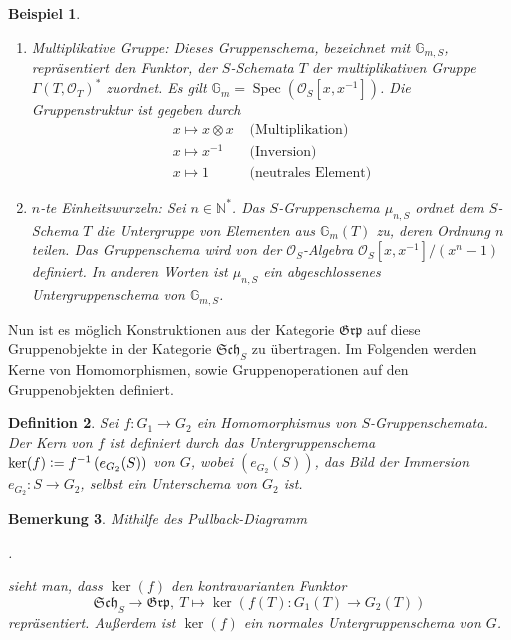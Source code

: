 \documentclass[DIV11,11pt]{scrartcl}
\theoremstyle{Definitionen}
\newtheorem{Def}{Definition}[section]
\newtheorem{Bem}[Def]{Bemerkung}
\newtheorem{Bsp}[Def]{Beispiel}
\theoremstyle{Aussagen}
\newcommand{\coloneq}{\ensuremath{\mathrel{\mathop{\raisebox{0.5pt}{:}}}=}}
\DeclareMathOperator{\Spec}{Spec}
\begin{document}
\begin{Bsp}\label{BspGruppenschema}
\begin{enumerate}
\item \textit{Multiplikative Gruppe}: Dieses Gruppenschema, bezeichnet mit $\mathbb{G}_{m,S}$, repräsentiert den Funktor, der $S$-Schemata $T$ der multiplikativen Gruppe $\Gamma(T,\mathcal{O}_T)^*$ zuordnet. Es gilt $\mathbb{G}_m=\Spec(\mathcal{O}_S\left[x,x^{-1}\right])$. Die Gruppenstruktur ist gegeben durch
\begin{align*}
x\mapsto x\otimes x &\text{ (Multiplikation)}\\
x\mapsto x^{-1} &\text{ (Inversion)}\\
x\mapsto 1 &\text{ (neutrales Element)}
\end{align*}
\item \textit{$n$-te Einheitswurzeln}: Sei $n\in\mathbb{N}^*$. Das $S$-Gruppenschema $\mu_{n,S}$ ordnet dem $S$-Schema $T$ die Untergruppe von Elementen aus $\mathbb{G}_m(T)$ zu, deren Ordnung $n$ teilen. Das Gruppenschema wird von der $\mathcal{O}_S$-Algebra $\mathcal{O}_S\left[x,x^{-1}\right]/(x^n-1)$ definiert. In anderen Worten ist $\mu_{n,S}$ ein abgeschlossenes Untergruppenschema von $\mathbb{G}_{m,S}$.
\end{enumerate}
\end{Bsp}

Nun ist es möglich Konstruktionen aus der Kategorie $\mathfrak{Grp}$ auf diese Gruppenobjekte in der Kategorie $\mathfrak{Sch}_S$ zu übertragen. Im Folgenden werden Kerne von Homomorphismen, sowie Gruppenoperationen auf den Gruppenobjekten definiert.

\begin{Def}\label{Kern}
Sei $f\colon G_1\rightarrow G_2$ ein Homomorphismus von $S$-Gruppenschemata. Der \textit{Kern von $f$} ist definiert durch das Untergruppenschema $\ker(f)\coloneq f^{-1}\left(e_{G_2}(S)\right)$ von $G$, wobei $\left(e_{G_2}(S)\right)$, das Bild der Immersion $e_{G_2}\colon S\rightarrow G_2$, selbst ein Unterschema von $G_2$ ist.
\end{Def}

\begin{Bem}
Mithilfe des Pullback-Diagramm
\begin{center}.\end{center}
sieht man, dass $\ker(f)$ den kontravarianten Funktor
\begin{displaymath}
\mathfrak{Sch}_S\rightarrow\mathfrak{Grp},~T\mapsto\ker\left(f(T)\colon G_1(T)\rightarrow G_2(T)\right)
\end{displaymath}
repräsentiert. Außerdem ist $\ker(f)$ ein normales Untergruppenschema von $G$.
\end{Bem}
\end{document}

